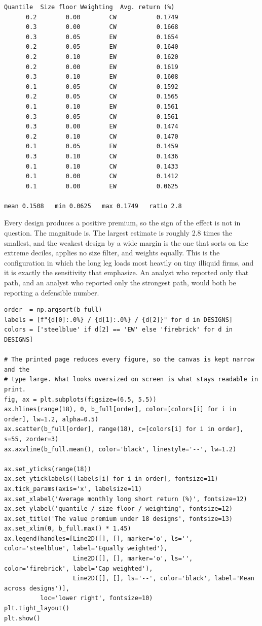 \begin{verbatim}
Quantile  Size floor Weighting  Avg. return (%)
      0.2        0.00        CW           0.1749
      0.3        0.00        CW           0.1668
      0.3        0.05        EW           0.1654
      0.2        0.05        EW           0.1640
      0.2        0.10        EW           0.1620
      0.2        0.00        EW           0.1619
      0.3        0.10        EW           0.1608
      0.1        0.05        CW           0.1592
      0.2        0.05        CW           0.1565
      0.1        0.10        EW           0.1561
      0.3        0.05        CW           0.1561
      0.3        0.00        EW           0.1474
      0.2        0.10        CW           0.1470
      0.1        0.05        EW           0.1459
      0.3        0.10        CW           0.1436
      0.1        0.10        CW           0.1433
      0.1        0.00        CW           0.1412
      0.1        0.00        EW           0.0625

mean 0.1508   min 0.0625   max 0.1749   ratio 2.8
\end{verbatim}

Every design produces a positive premium, so the sign of the effect is not in question. The magnitude is. The largest estimate is roughly 2.8 times the smallest, and the weakest design by a wide margin is the one that sorts on the extreme deciles, applies no size filter, and weights equally. This is the configuration in which the long leg loads most heavily on tiny illiquid firms, and it is exactly the sensitivity that \cite{asness2013devil} emphasize. An analyst who reported only that path, and an analyst who reported only the strongest path, would both be reporting a defensible number.

\begin{verbatim}
order  = np.argsort(b_full)
labels = [f"{d[0]:.0%} / {d[1]:.0%} / {d[2]}" for d in DESIGNS]
colors = ['steelblue' if d[2] == 'EW' else 'firebrick' for d in DESIGNS]

# The printed page reduces every figure, so the canvas is kept narrow and the
# type large. What looks oversized on screen is what stays readable in print.
fig, ax = plt.subplots(figsize=(6.5, 5.5))
ax.hlines(range(18), 0, b_full[order], color=[colors[i] for i in order], lw=1.2, alpha=0.5)
ax.scatter(b_full[order], range(18), c=[colors[i] for i in order], s=55, zorder=3)
ax.axvline(b_full.mean(), color='black', linestyle='--', lw=1.2)

ax.set_yticks(range(18))
ax.set_yticklabels([labels[i] for i in order], fontsize=11)
ax.tick_params(axis='x', labelsize=11)
ax.set_xlabel('Average monthly long short return (%)', fontsize=12)
ax.set_ylabel('quantile / size floor / weighting', fontsize=12)
ax.set_title('The value premium under 18 designs', fontsize=13)
ax.set_xlim(0, b_full.max() * 1.45)
ax.legend(handles=[Line2D([], [], marker='o', ls='', color='steelblue', label='Equally weighted'),
                   Line2D([], [], marker='o', ls='', color='firebrick', label='Cap weighted'),
                   Line2D([], [], ls='--', color='black', label='Mean across designs')],
          loc='lower right', fontsize=10)
plt.tight_layout()
plt.show()
\end{verbatim}

